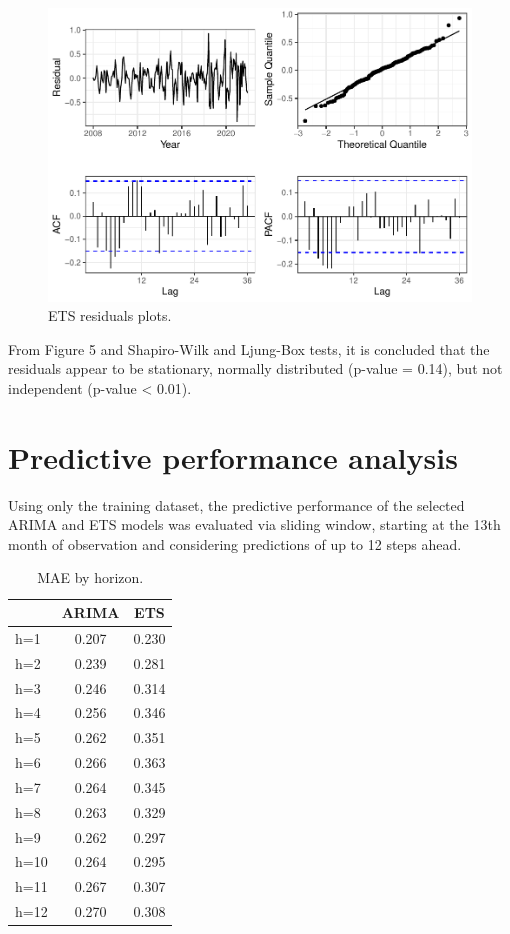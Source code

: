\documentclass{statsoc}
\begin{document}
\begin{figure}

{\centering \includegraphics[height=0.4\textheight]{Trabalho_2_article_files/figure-latex/ets-residuals-plots-1} 

}

\caption{ETS residuals plots.}\label{fig:ets-residuals-plots}
\end{figure}

From Figure 5 and Shapiro-Wilk and Ljung-Box tests, it is concluded that
the residuals appear to be stationary, normally distributed (p-value =
0.14), but not independent (p-value \textless{} 0.01).

\hypertarget{predictive-performance-analysis}{%
\section{Predictive performance
analysis}\label{predictive-performance-analysis}}

Using only the training dataset, the predictive performance of the
selected ARIMA and ETS models was evaluated via sliding window, starting
at the 13th month of observation and considering predictions of up to 12
steps ahead.

\begin{table}

\caption{\label{tab:sliding-window-table}MAE by horizon.}
\centering
\begin{tabular}[t]{lcc}
\toprule
  & ARIMA & ETS\\
\midrule
h=1 & 0.207 & 0.230\\
h=2 & 0.239 & 0.281\\
h=3 & 0.246 & 0.314\\
h=4 & 0.256 & 0.346\\
h=5 & 0.262 & 0.351\\
\addlinespace
h=6 & 0.266 & 0.363\\
h=7 & 0.264 & 0.345\\
h=8 & 0.263 & 0.329\\
h=9 & 0.262 & 0.297\\
h=10 & 0.264 & 0.295\\
\addlinespace
h=11 & 0.267 & 0.307\\
h=12 & 0.270 & 0.308\\
\bottomrule
\end{tabular}
\end{table}
\end{document}
